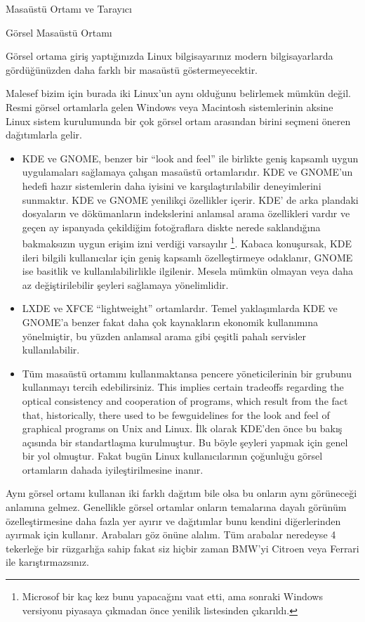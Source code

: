 \documentclass[10pt,a5paper]{book}
\begin{document}
\begin{section}{Masaüstü Ortamı ve Tarayıcı}
\begin{subsection}{Görsel Masaüstü Ortamı}

Görsel ortama giriş yaptığınızda Linux bilgisayarınız modern bilgisayarlarda gördüğünüzden daha farklı bir masaüstü göstermeyecektir. 

Malesef bizim için burada iki Linux’un aynı olduğunu belirlemek mümkün değil. Resmi görsel ortamlarla gelen Windows veya Macintosh sistemlerinin aksine Linux sistem kurulumunda bir çok görsel ortam arasından birini seçmeni öneren dağıtımlarla gelir. 
\begin{itemize}
\item KDE ve GNOME, benzer bir “look and feel” ile birlikte geniş kapsamlı uygun uygulamaları sağlamaya çalışan masaüstü ortamlarıdır. KDE ve GNOME’un hedefi hazır sistemlerin daha iyisini ve karşılaştırılabilir deneyimlerini sunmaktır. KDE ve GNOME yenilikçi özellikler içerir. KDE’ de arka plandaki dosyaların ve dökümanların indekslerini anlamsal arama özellikleri vardır ve geçen ay ispanyada çekildiğim fotoğraflara diskte nerede saklandığına bakmaksızın uygun erişim izni verdiği varsayılır
\footnote{Microsof bir kaç kez bunu yapacağını vaat etti, ama sonraki Windows versiyonu piyasaya çıkmadan önce yenilik listesinden çıkarıldı.
}. Kabaca konuşursak, KDE ileri bilgili kullanıcılar için geniş kapsamlı özelleştirmeye odaklanır, GNOME ise basitlik ve kullanılabilirlikle ilgilenir. Mesela mümkün olmayan veya daha az değiştirilebilir şeyleri sağlamaya yönelimlidir. 
\item LXDE ve XFCE “lightweight” ortamlardır. Temel yaklaşımlarda KDE ve GNOME’a benzer fakat daha çok kaynakların ekonomik kullanımına yönelmiştir, bu yüzden anlamsal arama gibi çeşitli pahalı servisler kullanılabilir. 
\item Tüm masaüstü ortamını kullanmaktansa pencere yöneticilerinin bir grubunu kullanmayı tercih edebilirsiniz. This implies certain tradeoffs regarding the optical consistency and cooperation of programs, which result from the fact that, historically, there used to be fewguidelines for the look and feel of graphical programs on Unix and Linux. İlk olarak KDE’den önce bu bakış açısında bir standartlaşma kurulmuştur. Bu böyle şeyleri yapmak için genel bir yol olmuştur. Fakat bugün Linux kullanıcılarının çoğunluğu görsel ortamların  dahada iyileştirilmesine inanır. 
\end{itemize}

Aynı görsel ortamı kullanan iki farklı dağıtım bile olsa bu onların aynı görüneceği anlamına gelmez. Genellikle görsel ortamlar onların temalarına dayalı görünüm özelleştirmesine daha fazla yer ayırır ve dağıtımlar bunu kendini diğerlerinden ayırmak için kullanır. Arabaları göz önüne alalım. Tüm arabalar neredeyse 4 tekerleğe bir rüzgarlığa sahip fakat siz hiçbir zaman BMW’yi Citroen veya Ferrari ile karıştırmazsınız. 


\end{subsection}
\end{section}
\end{document}

